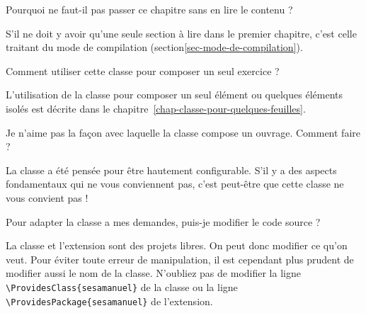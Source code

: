 \documentclass[nocrop]{sesamanuel}
\begin{document}
\begin{autoeval}
  \begin{multicols}{2}
    \begin{exercice}
      Pourquoi ne faut-il pas passer ce chapitre sans en lire le
      contenu ?
    \end{exercice}
    \begin{corrige}
      S'il ne doit y avoir qu'une seule section à lire dans le premier
      chapitre, c'est celle traitant du mode de compilation
      (section\ref{sec-mode-de-compilation}).
    \end{corrige}
    \begin{exercice}
      Comment utiliser cette classe pour composer un seul exercice ?
    \end{exercice}
    \begin{corrige}
      L'utilisation de la classe pour composer un seul élément ou
      quelques éléments isolés est décrite dans le
      chapitre~\ref{chap-classe-pour-quelques-feuilles}.
    \end{corrige}
    \begin{exercice}
      Je n'aime pas la façon avec laquelle la classe compose un
      ouvrage. Comment faire ?
    \end{exercice}
    \begin{corrige}
      La classe a été pensée pour être hautement configurable. S'il y a
      des aspects fondamentaux qui ne vous conviennent pas, c'est
      peut-être que cette classe ne vous convient pas !
    \end{corrige}
    \begin{exercice}
      Pour adapter la classe a mes demandes, puis-je modifier le code
      source ?
    \end{exercice}
    \begin{corrige}
      La classe et l'extension sont des projets libres. On peut donc
      modifier ce qu'on veut. Pour éviter toute erreur de manipulation,
      il est cependant plus prudent de modifier aussi le nom de la
      classe. N'oubliez pas de modifier la ligne
      \texttt{\textbackslash ProvidesClass\{sesamanuel\}} de la classe ou
      la ligne \texttt{\textbackslash ProvidesPackage\{sesamanuel\}} de
      l'extension.
    \end{corrige}
  \end{multicols}
\end{autoeval}

\cours
\end{document}
